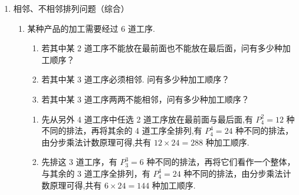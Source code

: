 \begin{enumerate}
\begin{enumerate}
\begin{jieda}
            若“乐”排在第 3 节，则从书、数种选一节排最后一节，要满足“礼”和“射”不相邻，则有 ${{C}}_{2}^{1}{{C}}_{2}^{1}{{C}}_{2}^{1}{{C}}_{2}^{1} = {16}$ 种方法,
            
            若“乐”排在第 4 节，则“书”与“数”排最后两节，要满足“礼”和“射”不相邻，则有 $P_{2}^{2}P_{2}^{2} = 4$ 种方法，
            
            故总的方法一共有 ${36} + {40} + {16} + 4 = {96}$
        \end{jieda}
    \end{enumerate}
    \item 相邻、不相邻排列问题（综合）
    \begin{enumerate}
        \item 某种产品的加工需要经过 6 道工序.
        \begin{enumerate}
            \item 若其中某 2 道工序不能放在最前面也不能放在最后面，问有多少种加工顺序？
            
            \item 若其中某 3 道工序必须相邻. 问有多少种加工顺序？
            
            \item 若其中某 3 道工序两两不能相邻，问有多少种加工顺序？
        \end{enumerate}
        \begin{jieda}
            \begin{enumerate}
                \item 先从另外 4 道工序中任选 2 道工序放在最前面与最后面,有 $P_{4}^{2} = {12}$ 种不同的排法，再将其余的 4 道工序全排列,有 $P_{4}^{4} = {24}$ 种不同的排法，由分步乘法计数原理可得,共有 ${12} \times  {24} = {288}$ 种加工顺序.

                \item 先排这 3 道工序，有 $P_{3}^{3} = 6$ 种不同的排法，再将它们看作一个整体，与其余的 3 道工序全排列，有 $P_{4}^{4} = {24}$ 种不同的排法，由分步乘法计数原理可得,共有 $6 \times  {24} = {144}$ 种加工顺序.
                

\end{enumerate}
\end{jieda}
\end{enumerate}
\end{enumerate}
